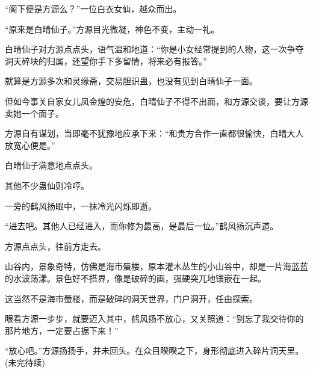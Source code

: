 \begin{this_body}
“阁下便是方源么？”一位白衣女仙，越众而出。

“原来是白晴仙子。”方源目光微凝，神色不变，主动一礼。

白晴仙子对方源点点头，语气温和地道：“你是小女经常提到的人物，这一次争夺洞天碎块的归属，还望你手下多留情，将来必有报答。”

就算是方源多次和灵缘斋，交易胆识蛊，也没有见到白晴仙子一面。

但如今事关自家女儿凤金煌的安危，白晴仙子不得不出面，和方源交谈，要让方源卖她一个面子。

方源自有谋划，当即毫不犹豫地应承下来：“和贵方合作一直都很愉快，白晴大人放宽心便是。”

白晴仙子满意地点点头。

其他不少蛊仙则冷哼。

一旁的鹤风扬眼中，一抹冷光闪烁即逝。

“进去吧。其他人已经进入，而你修为最高，是最后一位。”鹤风扬沉声道。

方源点点头，往前方走去。

山谷内，景象奇特，仿佛是海市蜃楼，原本灌木丛生的小山谷中，却是一片海蓝蓝的水波荡漾。景色好不搭界，像是破碎的画，强硬突兀地镶嵌在一起。

这当然不是海市蜃楼，而是破碎的洞天世界，门户洞开，任由探索。

眼看方源一步步，就要迈入其中，鹤风扬不放心，又关照道：“别忘了我交待你的那片地方，一定要占据下来！”

“放心吧。”方源扬扬手，并未回头。在众目睽睽之下，身形彻底进入碎片洞天里。(未完待续)

\end{this_body}

